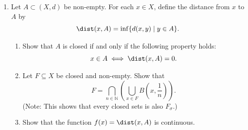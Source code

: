 \documentclass[notoc,notitlepage]{tufte-book}
\begin{document}
\begin{enumerate}
  \item Let $A \subset (X, d)$ be non-empty. For each $x \in X$, define the distance from $x$ to $A$ by
    \begin{equation*}
      \dist(x, A) = \inf \{ d(x, y) \mid y \in A \}.
    \end{equation*}
    \begin{enumerate}
      \item Show that $A$ is closed if and only if the following property holds:
        \begin{equation*}
          x \in A \iff \dist(x, A) = 0.
        \end{equation*}
      \item Let $F \subseteq X$ be closed and non-empty. Show that
        \begin{equation*}
          F = \bigcap_{n \in \mathbb{N}} \left( \bigcup_{x \in F} B \left( x, \frac{1}{n} \right) \right).
        \end{equation*}
        (Note: This shows that every closed sets is also $F_\sigma$.)
      \item Show that the function $f(x) = \dist(x, A)$ is continuous.
    \end{enumerate}


\end{enumerate}
\end{document}
